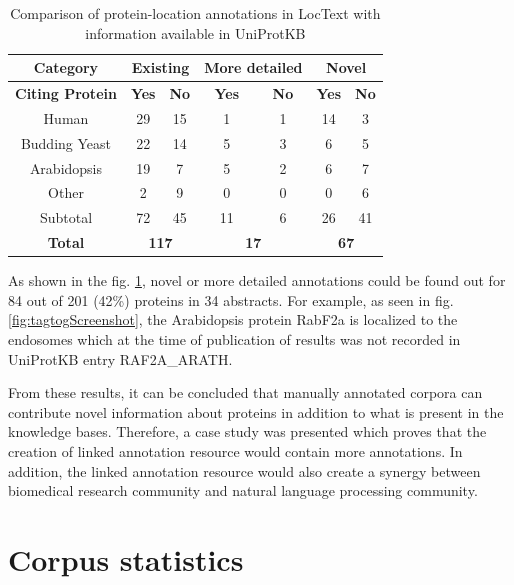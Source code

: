 \begin{table}
\centering
\begin{tabular}{|c|c|c|c|c|c|c|}
\hline
\textbf{Category} & \multicolumn{2}{c|}{\textbf{Existing}} & \multicolumn{2}{c|}{\textbf{More detailed}} & \multicolumn{2}{c|}{\textbf{Novel}} \\ 
\hline
\textbf{Citing Protein} & \textbf{Yes} & \textbf{No} & \textbf{Yes} & \textbf{No} & \textbf{Yes} & \textbf{No} \\
\hline
Human & 29 & 15 & 1 & 1 & 14 & 3 \\
Budding Yeast & 22 & 14 & 5 & 3 & 6 & 5 \\
Arabidopsis & 19 & 7 & 5 & 2 & 6 & 7 \\
Other & 2 & 9 & 0 & 0 & 0 & 6 \\
\hline
Subtotal & 72 & 45 & 11 & 6 & 26 & 41 \\
\hline
\textbf{Total} & \multicolumn{2}{c|}{\textbf{117}} & \multicolumn{2}{c|}{\textbf{17}} & \multicolumn{2}{c|}{\textbf{67}} \\ 
 \hline
\end{tabular}
\caption{Comparison of protein-location annotations in LocText with information available in UniProtKB}\label{tab:novelAnnotation}
\end{table}

As shown in the fig. \ref{tab:novelAnnotation}, novel or more detailed annotations could be found out for 84 out of 201 (42\%) proteins in 34 abstracts. For example, as seen in fig. \ref{fig:tagtogScreenshot}, the Arabidopsis protein RabF2a is localized to the endosomes which at the time of publication of results was not recorded in UniProtKB entry RAF2A\_ARATH.

From these results, it can be concluded that manually annotated corpora can contribute novel information about proteins in addition to what is present in the knowledge bases. Therefore, a case study was presented which proves that the creation of linked annotation resource would contain more annotations. In addition, the linked annotation resource would also create a synergy between biomedical research community and natural language processing community.

\section{Corpus statistics}\label{sec:corpusStats}


